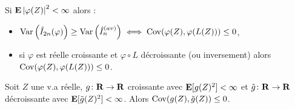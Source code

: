 	\begin{pop}
		Si $\mathbf{E} \left\lvert\varphi(Z)\right\rvert^2 < \infty$ alors :
		\begin{itemize}
			\item[\textbullet] $\operatorname{Var} \left( \hat{I}_{2n}(\varphi) \right) \geq \operatorname{Var} \left( \hat{I}^{(av)}_n \right) \iff \operatorname{Cov}(\varphi(Z), \varphi(L(Z))) \leq 0$,
			\item[\textbullet] si $\varphi$ est réelle croissante et $\varphi \circ L$ décroissante (ou inversement) alors $\operatorname{Cov}(\varphi(Z), \varphi(L(Z))) \leq 0$.
		\end{itemize}
	\end{pop}
	
	\begin{lem}
		Soit $Z$ une v.a réelle, $g \colon \mathbf{R} \to \mathbf{R}$ croissante avec $\mathbf{E}[g(Z)^2] < \infty$ et $\tilde{g} \colon \mathbf{R} \to \mathbf{R}$ décroissante avec $\mathbf{E}[\tilde{g}(Z)^2] < \infty$.
		Alors $\operatorname{Cov}(g(Z),\tilde{g}(Z)) \leq 0$.
	\end{lem}